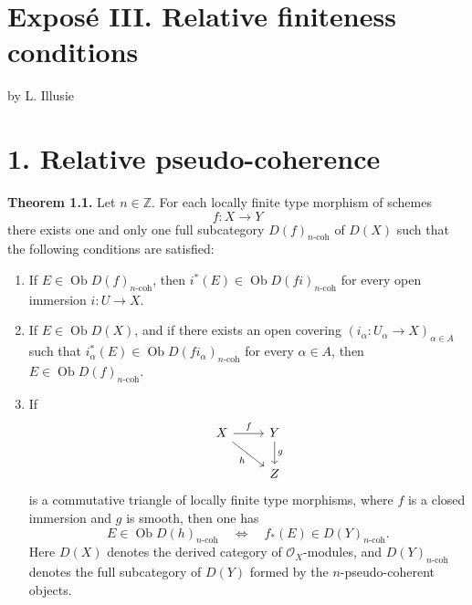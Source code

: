 \providecommand{\Ob}{\operatorname{Ob}}
\providecommand{\qcoh}{\mathrm{qcoh}}
\providecommand{\coh}{\mathrm{coh}}
\providecommand{\torf}{\mathrm{torf}}
\providecommand{\toramp}{\operatorname{tor.amp}}
\providecommand{\amp}{\operatorname{amp}}
\providecommand{\Id}{\operatorname{Id}}
\providecommand{\pr}{\operatorname{pr}}
\providecommand{\coker}{\operatorname{coker}}
\providecommand{\im}{\operatorname{Im}}
\providecommand{\Spec}{\operatorname{Spec}}


\section*{Exposé III. Relative finiteness conditions}
\begin{center}
by L. Illusie
\end{center}

\section*{1. Relative pseudo-coherence}

\textbf{Theorem 1.1.} Let \(n\in \mathbb Z\). For each locally finite type morphism of schemes
\[
  f:X\longrightarrow Y
\]
there exists one and only one full subcategory \(D(f)_{n\text{-}\coh}\) of \(D(X)\) such that the following conditions are satisfied:

\begin{enumerate}[label=(\roman*)]
\item If \(E\in \Ob D(f)_{n\text{-}\coh}\), then \(i^*(E)\in \Ob D(fi)_{n\text{-}\coh}\) for every open immersion \(i:U\to X\).

\item If \(E\in \Ob D(X)\), and if there exists an open covering \((i_\alpha:U_\alpha\to X)_{\alpha\in A}\) such that \(i_\alpha^*(E)\in \Ob D(fi_\alpha)_{n\text{-}\coh}\) for every \(\alpha\in A\), then \(E\in \Ob D(f)_{n\text{-}\coh}\).

\item If
\[
\begin{tikzcd}
X \arrow[r,"f"] \arrow[dr,"h"'] & Y \arrow[d,"g"]\\
& Z
\end{tikzcd}
\]
is a commutative triangle of locally finite type morphisms, where \(f\) is a closed immersion and \(g\) is smooth, then one has
\[
  E\in \Ob D(h)_{n\text{-}\coh}
  \quad\Longleftrightarrow\quad
  f_*(E)\in D(Y)_{n\text{-}\coh}.
\]
Here \(D(X)\) denotes the derived category of \(\mathcal O_X\)-modules, and \(D(Y)_{n\text{-}\coh}\) denotes the full subcategory of \(D(Y)\) formed by the \(n\)-pseudo-coherent objects.
\end{enumerate}

